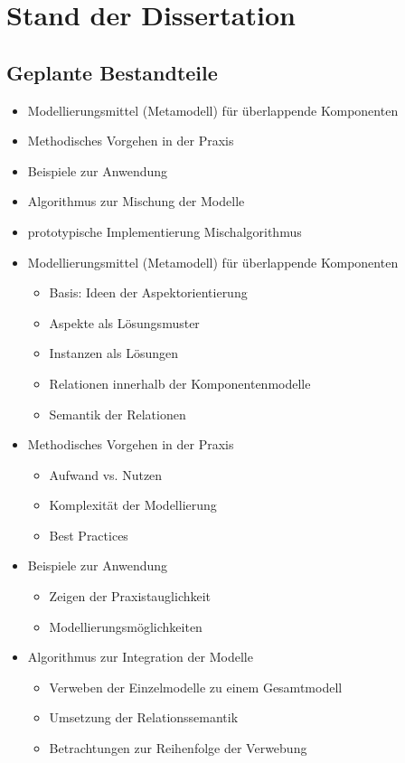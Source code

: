 	\section{Stand der Dissertation}

	\subsection{Geplante Bestandteile}

	\begin{frame}{\insertsectionhead}{\insertsubsectionhead}
		\begin{itemize}
			\item Modellierungsmittel (Metamodell) für überlappende Komponenten
			\item Methodisches Vorgehen in der Praxis
			\item Beispiele zur Anwendung
			\item Algorithmus zur Mischung der Modelle
			\item prototypische Implementierung Mischalgorithmus
		\end{itemize}
	\end{frame}

	\begin{itemize}
		\item Modellierungsmittel (Metamodell) für überlappende Komponenten
					\begin{itemize}
						\item Basis: Ideen der Aspektorientierung
						\item Aspekte als Lösungsmuster
						\item Instanzen als Lösungen
						\item Relationen innerhalb der Komponentenmodelle
						\item Semantik der Relationen
					\end{itemize}
		\item Methodisches Vorgehen in der Praxis
					\begin{itemize}
						\item Aufwand vs. Nutzen
						\item Komplexität der Modellierung
						\item Best Practices
					\end{itemize}
		\item Beispiele zur Anwendung
					\begin{itemize}
						\item Zeigen der Praxistauglichkeit
						\item Modellierungsmöglichkeiten
					\end{itemize}
		\item Algorithmus zur Integration der Modelle
					\begin{itemize}
						\item Verweben der Einzelmodelle zu einem Gesamtmodell
						\item Umsetzung der Relationssemantik
						\item Betrachtungen zur Reihenfolge der Verwebung
					\end{itemize}
	\end{itemize}

